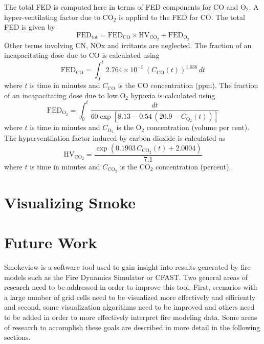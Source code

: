 \documentclass[11pt,twoside]{book}
\newcommand{\be}{\begin{equation}}
\newcommand{\ee}{\end{equation}}
\begin{document}
The total FED is computed here in terms of FED components for CO and $\mathrm{O_2}$.  A hyper-ventilating factor due to $\mathrm{CO_2}$ is applied to
the FED for CO. The total FED is given by
\be
\mathrm{FED}_\mathrm{tot} = \mathrm{FED}_\mathrm{CO} \times \mathrm{HV}_\mathrm{CO_2} + \mathrm{FED}_\mathrm{O_2}
\ee
Other terms involving CN, NOx and irritants are neglected.
The fraction of an incapacitating dose due to CO is calculated using
\be
\mathrm{FED}_\mathrm{CO} = \int_0^t 2.764 \times 10^{-5} \, (C_\mathrm{CO}(t))^{1.036} \, dt
\ee
where $t$ is time in minutes and $C_\mathrm{CO}$ is the CO concentration (ppm).
The fraction of an incapacitating dose due to low O${}_2$ hypoxia is calculated using
\be
\mathrm{FED}_\mathrm{O_2} =  \int_0^t \frac{dt}{60 \exp \left [ 8.13 - 0.54 \, (20.9 - C_\mathrm{O_2}(t)) \right ] }
\ee
where $t$ is time in minutes and $C_\mathrm{O_2}$ is the O${}_2$ concentration (volume per cent).
The hyperventilation factor induced by carbon dioxide is calculated as
\be
\mathrm{HV}_\mathrm{CO_2} = \frac{ \exp( 0.1903 \, C_\mathrm{CO_2}(t) +  2.0004 ) }{7.1} \label{co2hyp}
\ee
where $t$ is time in minutes and $C_\mathrm{CO_2}$ is the CO${}_2$ concentration (percent).


%
%

\chapter{Visualizing Smoke}

\newcommand{\citesmv}{\cite{Smokeview_Users_Guide}}
\newcommand{\paper}{chapter}

%
%

\chapter{Future Work}

Smokeview is a software tool used to gain insight into results
generated by fire models such as the Fire Dynamics Simulator or
CFAST. Two general areas of research need to be addressed in order
to improve this tool. First, scenarios with a large number of grid
cells need to be visualized more effectively and efficiently and
second, some visualization algorithms need to be improved and
others need to be added in order to more effectively interpret
fire modeling data. Some areas of research to accomplish these
goals are described in more detail in the following sections.
\end{document}
